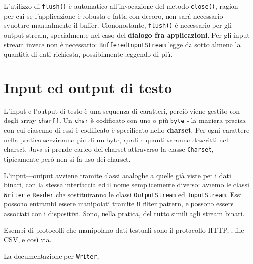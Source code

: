 \documentclass[\fontsizeclass,twocolumn]{\classname}
\theoremstyle{definition}
\theoremstyle{definition}
\begin{document}
L'utilizzo di \texttt{flush()} è automatico all'invocazione del metodo
\texttt{close()}, ragion per cui se l'applicazione è robusta e fatta con
decoro, non sarà necessario svuotare manualmente il buffer. Ciononostante,
\texttt{flush()} è necessario per gli output stream, specialmente nel caso del
\textbf{dialogo fra applicazioni}. Per gli input stream invece non è
necessario: \texttt{BufferedInputStream} legge da sotto almeno la quantità di
dati richiesta, possibilmente leggendo di più.

\chapter{Input ed output di testo}

L'input e l'output di testo è una sequenza di caratteri, perciò viene gestito
con degli array \texttt{char[]}. Un \texttt{char} è codificato con uno o più
\texttt{byte} \-- la maniera precisa con cui ciascuno di essi è codificato è
specificato nello \textbf{charset}. Per ogni carattere nella pratica serviranno
più di un byte, quali e quanti saranno descritti nel charset. Java si prende
carico dei charset attraverso la classe \texttt{Charset}, tipicamente però non
si fa uso dei charset.

L'input\----output avviene tramite classi analoghe a quelle già viste per i
dati binari, con la stessa interfaccia ed il nome semplicemente diverso:
avremo le classi \texttt{Writer} e \texttt{Reader} che sostituiranno le classi
\texttt{Output\-Stream} ed \texttt{Input\-Stream}. Essi possono entrambi essere
manipolati tramite il filter pattern, e possono essere associati con i
dispositivi. Sono, nella pratica, del tutto simili agli stream binari.

Esempi di protocolli che manipolano dati testuali sono il protocollo HTTP, i
file CSV, e così via.

La documentazione per \texttt{Writer},
\end{document}
